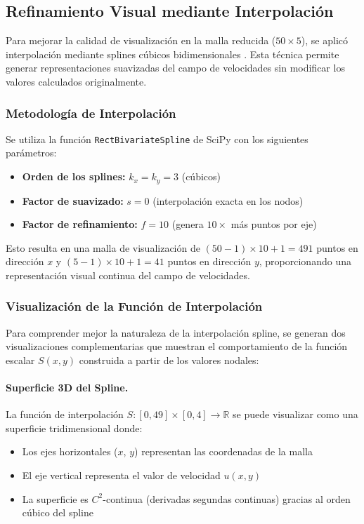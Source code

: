 \documentclass[11pt,letterpaper]{article}
\begin{document}
\subsection{Refinamiento Visual mediante Interpolación}

Para mejorar la calidad de visualización en la malla reducida ($50\times5$), se aplicó interpolación mediante splines cúbicos bidimensionales \cite{SciPy}. Esta técnica permite generar representaciones suavizadas del campo de velocidades sin modificar los valores calculados originalmente.

\subsubsection{Metodología de Interpolación}

Se utiliza la función \texttt{RectBivariateSpline} de SciPy con los siguientes parámetros:
\begin{itemize}
    \item \textbf{Orden de los splines:} $k_x = k_y = 3$ (cúbicos)
    \item \textbf{Factor de suavizado:} $s = 0$ (interpolación exacta en los nodos)
    \item \textbf{Factor de refinamiento:} $f = 10$ (genera $10\times$ más puntos por eje)
\end{itemize}

Esto resulta en una malla de visualización de $(50-1)\times10 + 1 = 491$ puntos en dirección $x$ y $(5-1)\times10 + 1 = 41$ puntos en dirección $y$, proporcionando una representación visual continua del campo de velocidades.

\subsubsection{Visualización de la Función de Interpolación}

Para comprender mejor la naturaleza de la interpolación spline, se generan dos visualizaciones complementarias que muestran el comportamiento de la función escalar $S(x,y)$ construida a partir de los valores nodales:

\paragraph{Superficie 3D del Spline.} La función de interpolación $S: [0, 49] \times [0, 4] \to \mathbb{R}$ se puede visualizar como una superficie tridimensional donde:
\begin{itemize}
    \item Los ejes horizontales ($x$, $y$) representan las coordenadas de la malla
    \item El eje vertical representa el valor de velocidad $u(x,y)$
    \item La superficie es $C^2$-continua (derivadas segundas continuas) gracias al orden cúbico del spline
\end{itemize}
\end{document}
